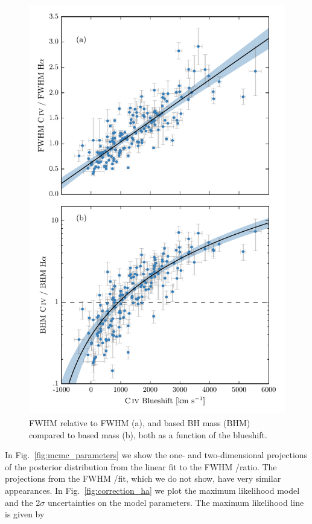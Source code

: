 \begin{figure}
    \includegraphics[width=\textwidth]{figures/chapter03/fwhm_and_bhm_ha.pdf} 
    \caption{ FWHM relative to \hb FWHM (a), and  based BH mass (BHM) compared to \hb based mass (b), both as a function of the  blueshift.}  
    \label{fig:correction_hb}
\end{figure}

In Fig.~\ref{fig:mcmc_parameters} we show the one- and two-dimensional projections of the posterior distribution from the linear fit to the FWHM /\ha ratio. 
The projections from the FWHM /\hb fit, which we do not show, have very similar appearances.
In Fig.~\ref{fig:correction_ha} we plot the maximum likelihood model and the 2$\sigma$ uncertainties on the model parameters. 
The maximum likelihood line is given by  

